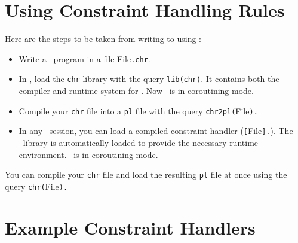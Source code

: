 \section{Using Constraint Handling Rules}

Here are the steps to be taken from writing to using \chrs:
\begin{itemize}
 \item Write a \chr\ program in a file 
File\verb/.chr/.

 \item In \eclipse, load the {\tt chr} library with the query
\verb/lib(chr)/. It contains both the compiler and runtime system for
\chrs. Now \eclipse\ is in coroutining mode.

 \item Compile your \verb/chr/ file into a \verb/pl/ file with the query
 \verb/chr2pl(/File\verb/)./

\item In any \eclipse\ session, you can load a compiled constraint handler
(\verb/[/File\verb/]./). The \chr\ library is automatically loaded
to provide the necessary runtime environment. \eclipse\ is in coroutining mode.

\end{itemize}
You can compile your \verb/chr/ file and load the resulting \verb/pl/ file
at once using the query \verb/chr(/File\verb/)./



\section{Example Constraint Handlers}

